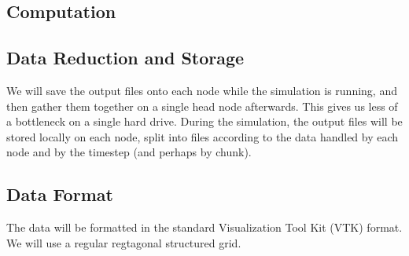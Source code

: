 \subsection{Computation}

\subsection{Data Reduction and Storage}

We will save the output files onto each node while the simulation is running, and then gather them together on a single head node afterwards. This gives us less of a bottleneck on a single hard drive. During the simulation, the output files will be stored locally on each node, split into files according to the data handled by each node and by the timestep (and perhaps by chunk).


\subsection{Data Format}

The data will be formatted in the standard Visualization Tool Kit (VTK) format. We will use a regular regtagonal structured grid.
